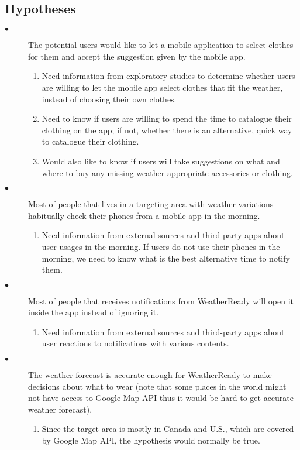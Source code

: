 \documentclass{sigchi}
\begin{document}
\subsection{Hypotheses}
\begin{description}
\item[$\bullet$] The potential users would like to let a mobile application to select clothes for them and accept the suggestion given by the mobile app.
\begin{enumerate}[label=\alph*]
\item Need information from exploratory studies to determine whether users are willing to let the mobile app select clothes that fit the weather, instead of choosing their own clothes.
\item Need to know if users are willing to spend the time to catalogue their clothing on the app; if not, whether there is an alternative, quick way to catalogue their clothing.
\item Would also like to know if users will take suggestions on what and where to buy any missing weather-appropriate accessories or clothing.
\end{enumerate}
\item[$\bullet$]Most of people that lives in a targeting area with weather variations habitually check their phones from a mobile app in the morning.
\begin{enumerate}[label=\alph*]
\item Need information from external sources and third-party apps about user usages in the morning. If users do not use their phones in the morning, we need to know what is the best alternative time to notify them.
\end{enumerate}
\item[$\bullet$]Most of people that receives notifications from WeatherReady will open it inside the app instead of ignoring it.
\begin{enumerate}[label=\alph*]
\item Need information from external sources and third-party apps about user reactions to notifications with various contents.
\end{enumerate}
\item[$\bullet$]The weather forecast is accurate enough for WeatherReady to make decisions about what to wear (note that some places in the world might not have access to Google Map API thus it would be hard to get accurate weather forecast).
\begin{enumerate}[label=\alph*]
\item Since the target area is mostly in Canada and U.S., which are covered by Google Map API, the hypothesis would normally be true.
\end{enumerate}

\end{description}
\end{document}
